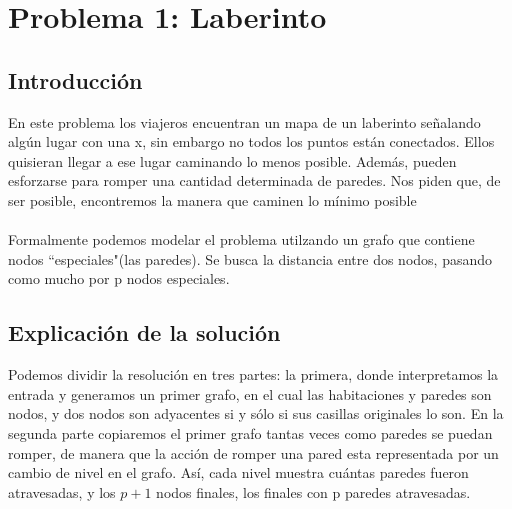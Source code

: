\documentclass[spanish,12pt]{article}
\begin{document}
\author{Grupo  \\Alvarez Vico Jazm\'in\\Cortés Conde Titó Javier María\\Pedraza Marcelo \\ Rozenberg Uriel Jonathan}


\maketitle


\clearpage

\tableofcontents
\cleardoublepage

\section{Problema 1: Laberinto}

\subsection{Introducción}

En este problema los viajeros encuentran un mapa de un laberinto señalando algún lugar con una x, sin embargo no todos los puntos están conectados. Ellos quisieran llegar a ese lugar caminando lo menos posible. Además, pueden esforzarse para romper una cantidad determinada de paredes. Nos piden que, de ser posible, encontremos la manera que caminen lo mínimo posible
\\
\\
Formalmente podemos modelar el problema utilzando un grafo que contiene nodos ``especiales"(las paredes). Se busca la distancia entre dos nodos, pasando como mucho por p nodos especiales.

\subsection{Explicación de la solución}
Podemos dividir la resolución en tres partes: la primera, donde interpretamos la entrada y generamos un primer grafo, en el cual las habitaciones y paredes son nodos, y dos nodos son adyacentes si y sólo si sus casillas originales lo son. En la segunda parte copiaremos el primer grafo tantas veces como paredes se puedan romper, de manera que la acción de romper una pared esta representada por un cambio de nivel en el grafo. Así, cada nivel muestra cuántas paredes fueron atravesadas, y los $p+1$ nodos finales, los finales con p paredes atravesadas.
\end{document}
